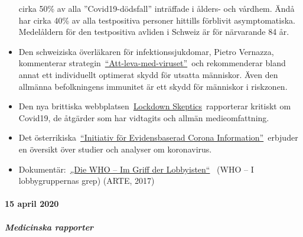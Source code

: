 \begin{itemize}
  cirka 50\% av alla ''Covid19-dödsfall'' inträffade i ålders- och
  vårdhem. Ändå har cirka 40\% av alla testpositiva personer hittills
  förblivit asymptomatiska. Medelåldern för den testpositiva avliden i
  Schweiz är för närvarande 84 år.
\item
  Den schweiziska överläkaren för infektionssjukdomar, Pietro Vernazza,
  kommenterar
  strategin~\href{https://infekt.ch/2020/04/exitstrategie-lockdown/}{``Att-leva-med-viruset''}~och
  rekommenderar bland annat ett individuellt optimerat skydd för utsatta
  människor. Även den allmänna befolkningens immunitet är ett skydd för
  människor i riskzonen.
\item
  Den nya brittiska
  webbplatsen~\href{https://lockdownsceptics.org/}{Lockdown
  Skeptics}~rapporterar kritiskt om Covid19, de åtgärder som har
  vidtagits och allmän medieomfattning.
\item
  Det
  österrikiska~\href{https://www.initiative-corona.info/}{``Initiativ
  för Evidensbaserad Corona Information''}~erbjuder en översikt över
  studier och analyser om koronavirus.
\item
  Dokumentär:~\href{https://www.youtube.com/watch?v=dYlia_fQOLk}{„Die
  WHO -- Im Griff der Lobbyisten``}~ (WHO -- I lobbygruppernas grep)
  (ARTE, 2017)
\end{itemize}

\hypertarget{15-april-2020}{%
\paragraph{15 april 2020}\label{15-april-2020}}

\hypertarget{medicinska-rapporter}{%
\subparagraph{\texorpdfstring{\textbf{Medicinska
rapporter}}{Medicinska rapporter}}\label{medicinska-rapporter}}

